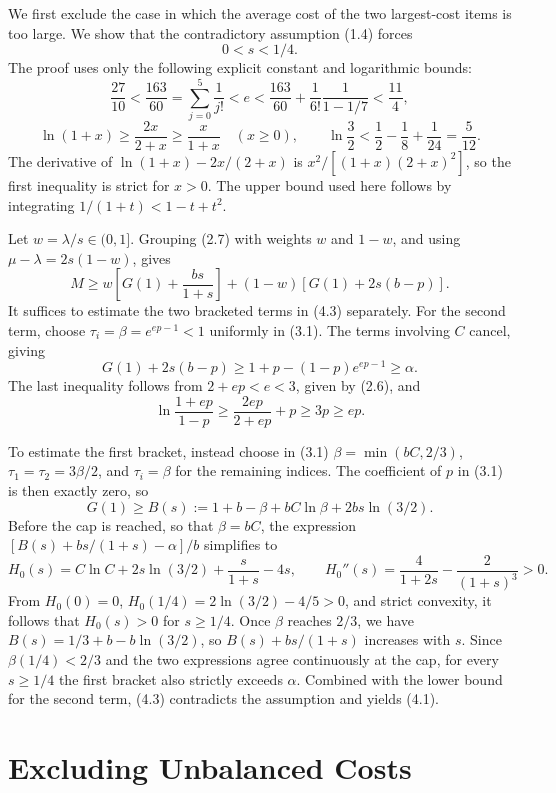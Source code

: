 \documentclass[11pt,a4paper]{article}
\begin{document}
We first exclude the case in which the average cost of the two largest-cost items is too large. We show that the contradictory assumption (1.4) forces
\begin{equation}
0<s<1/4.
\tag{4.1}
\end{equation}
The proof uses only the following explicit constant and logarithmic bounds:
\[
\frac{27}{10}<\frac{163}{60}=\sum_{j=0}^5\frac1{j!}<e
<\frac{163}{60}+\frac1{6!}\frac1{1-1/7}<\frac{11}{4},
\]
\begin{equation}
\ln(1+x)\ge\frac{2x}{2+x}\ge\frac{x}{1+x}\quad(x\ge0),
\qquad \ln\frac32<\frac12-\frac18+\frac1{24}=\frac5{12}.
\tag{4.2}
\end{equation}
The derivative of $\ln(1+x)-2x/(2+x)$ is $x^2/[(1+x)(2+x)^2]$, so the first inequality is strict for $x>0$. The upper bound used here follows by integrating $1/(1+t)<1-t+t^2$.

Let $w=\lambda/s\in(0,1]$. Grouping (2.7) with weights $w$ and $1-w$, and using $\mu-\lambda=2s(1-w)$, gives
\begin{equation}
M\ge w\left[G(1)+\frac{bs}{1+s}\right]
+(1-w)\left[G(1)+2s(b-p)\right].
\tag{4.3}
\end{equation}
It suffices to estimate the two bracketed terms in (4.3) separately. For the second term, choose
$\tau_i=\beta=e^{ep-1}<1$ uniformly in (3.1). The terms involving $C$ cancel, giving
\[
G(1)+2s(b-p)\ge1+p-(1-p)e^{ep-1}\ge\alpha.
\]
The last inequality follows from $2+ep<e<3$, given by (2.6), and
\[
\ln\frac{1+ep}{1-p}\ge\frac{2ep}{2+ep}+p\ge3p\ge ep.
\]

To estimate the first bracket, instead choose in (3.1)
$\beta=\min(bC,2/3)$, $\tau_1=\tau_2=3\beta/2$, and $\tau_i=\beta$ for the remaining indices.
The coefficient of $p$ in (3.1) is then exactly zero, so
\[
G(1)\ge B(s):=1+b-\beta+bC\ln\beta+2bs\ln(3/2).
\]
Before the cap is reached, so that $\beta=bC$, the expression $[B(s)+bs/(1+s)-\alpha]/b$ simplifies to
\[
H_0(s)=C\ln C+2s\ln(3/2)+\frac{s}{1+s}-4s,
\qquad H_0''(s)=\frac4{1+2s}-\frac2{(1+s)^3}>0.
\]
From $H_0(0)=0$, $H_0(1/4)=2\ln(3/2)-4/5>0$, and strict convexity, it follows that
$H_0(s)>0$ for $s\ge1/4$.
Once $\beta$ reaches $2/3$, we have $B(s)=1/3+b-b\ln(3/2)$, so $B(s)+bs/(1+s)$ increases with $s$. Since $\beta(1/4)<2/3$ and the two expressions agree continuously at the cap, for every $s\ge1/4$ the first bracket also strictly exceeds $\alpha$. Combined with the lower bound for the second term, (4.3) contradicts the assumption and yields (4.1).

\section{Excluding Unbalanced Costs}
\end{document}
